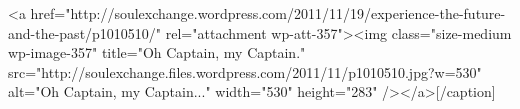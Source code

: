 \begin{post}
\begin{content}
[caption id="attachment_357" align="aligncenter" width="530" caption="&quot;Oh Captain, my Captain...&quot; — André is on a boat!"]<a href="http://soulexchange.wordpress.com/2011/11/19/experience-the-future-and-the-past/p1010510/" rel="attachment wp-att-357"><img class="size-medium wp-image-357" title="Oh Captain, my Captain." src="http://soulexchange.files.wordpress.com/2011/11/p1010510.jpg?w=530" alt="Oh Captain, my Captain..." width="530" height="283" /></a>[/caption] 
	\end{content}
\end{post}
